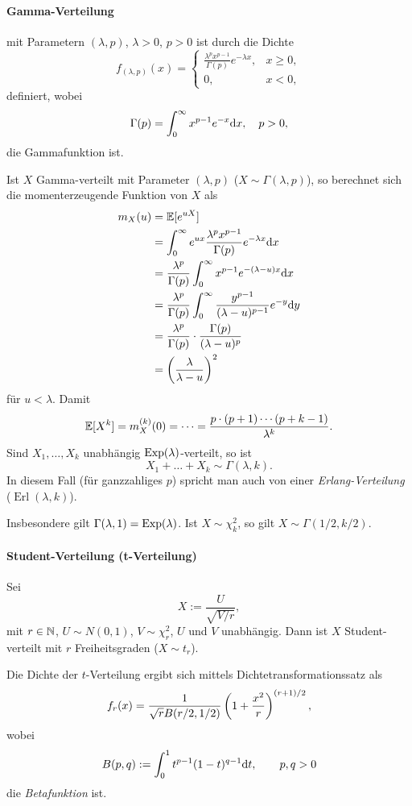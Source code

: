\paragraph{Gamma-Verteilung}
mit Parametern $(\lambda, p)$, $\lambda > 0$, $p > 0$ ist durch die Dichte
\[ f_{(\lambda, p)} (x) = \begin{cases}
    \frac{\lambda^p x^{p-1}}{\Gamma(p)} e^{-\lambda x}, & x \ge 0, \\
    0, & x < 0, 
  \end{cases} \]
definiert, wobei
\[ \Gamma(p) = \int_0^\infty x^{p-1} e^{-x} \mathrm{d} x, \quad p > 0, \]
die Gammafunktion ist.

Ist $X$ Gamma-verteilt mit Parameter $(\lambda, p)$ ($X \sim \Gamma(\lambda,
p)$), so berechnet sich die momenterzeugende Funktion von $X$ als
\[ \begin{aligned}
    m_X(u)
    &= \mathbb{E}[e^{uX}] \\
    &= \int_0^\infty e^{ux} \frac{\lambda^p x^{p-1}}{\Gamma(p)} e^{-\lambda x}
    \mathrm{d} x \\
    &= \frac{\lambda^p}{\Gamma(p)} \int_0^\infty x^{p-1} e^{-(\lambda-u)x}
    \mathrm{d} x \\
    &= \frac{\lambda^p}{\Gamma(p)} \int_0^\infty \frac{y^{p-1}}{(\lambda-u)^{p-1}}
    e^{-y} \mathrm{d} y \\
    &= \frac{\lambda^p}{\Gamma(p)} \cdot \frac{\Gamma(p)}{(\lambda-u)^p} \\
    &= \left( \frac{\lambda}{\lambda -u} \right)^2
  \end{aligned}
\]
für $u < \lambda$. Damit
\[ \mathbb{E}[X^k] = m_X^{(k)}(0) = \cdots = \frac{p \cdot (p+1) \cdots
    (p+k-1)}{\lambda^k}. \]
Sind $X_1, \ldots, X_k$ unabhängig $\operatorname*{Exp}(\lambda)$-verteilt, so ist
\[ X_1 + \ldots + X_k \sim \Gamma(\lambda, k). \]
In diesem Fall (für ganzzahliges $p$) spricht man auch von einer
\emph{Erlang-Verteilung} ($\operatorname{Erl}(\lambda, k)$).

Insbesondere gilt $\Gamma( \lambda, 1 ) = \operatorname*{Exp}(\lambda)$. Ist $X \sim \chi^2_k$,
so gilt $X \sim \Gamma( 1/2, k/2 )$.

\paragraph{Student-Verteilung (t-Verteilung)}
Sei
\[ X := \frac{U}{\sqrt{V/r}}, \]
mit $r \in \mathbb{N}$, $U \sim N(0,1)$, $V \sim \chi^2_r$, $U$ und $V$ unabhängig.
Dann ist $X$ Student-verteilt mit $r$ Freiheitsgraden ($X \sim t_r$).

Die Dichte der $t$-Verteilung ergibt sich mittels Dichtetransformationssatz als
\[ f_r(x) = \frac{1}{\sqrt{r} B(r/2,1/2)} \left(1 + \frac{x^2}{r}
  \right)^{(r+1)/2}, \]
wobei
\[ B(p,q) := \int_0^1 t^{p-1} (1-t)^{q-1} \mathrm{d} t, \qquad p,q > 0 \]
die \emph{Betafunktion} ist.

